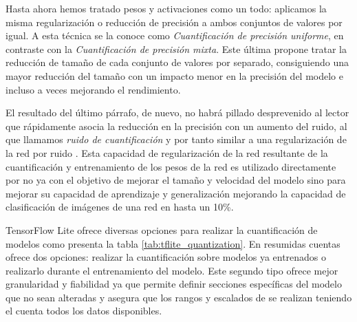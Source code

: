Hasta ahora hemos tratado pesos y activaciones como un todo: aplicamos la misma regularización o reducción de precisión a ambos conjuntos de valores por igual. A esta técnica se la conoce como \textit{Cuantificación de precisión uniforme}, en contraste con la \textit{Cuantificación de precisión mixta}. Este última propone tratar la reducción de tamaño de cada conjunto de valores por separado, consiguiendo una mayor reducción del tamaño con un impacto menor en la precisión del modelo \cite{Jin2019} e incluso a veces mejorando el rendimiento. 

El resultado del último párrafo, de nuevo, no habrá pillado desprevenido al lector que rápidamente asocia la reducción en la precisión con un aumento del ruido, al que llamamos \textit{ruido de cuantificación} y por tanto similar a una regularización de la red por ruido \cite{Bishop1995,Noh2017}. Esta capacidad de regularización de la red resultante de la cuantificación y entrenamiento de los pesos de la red es utilizado directamente por  no ya con el objetivo de mejorar el tamaño y velocidad del modelo sino para mejorar su capacidad de aprendizaje y generalización mejorando la capacidad de clasificación de imágenes de una red en hasta un 10\%. 

TensorFlow Lite ofrece diversas opciones para realizar la cuantificación de modelos como presenta la tabla \ref{tab:tflite_quantization}. En resumidas cuentas ofrece dos opciones: realizar la cuantificación sobre modelos ya entrenados o realizarlo durante el entrenamiento del modelo. Este segundo tipo ofrece mejor granularidad y fiabilidad ya que permite definir secciones específicas del modelo que no sean alteradas y asegura que los rangos y escalados de se realizan teniendo el cuenta todos los datos disponibles. 



